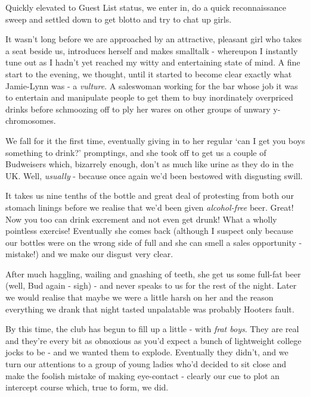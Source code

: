 \documentclass[a5paper,titlepage,11pt,draft]{book}
\begin{document}
Quickly elevated to Guest List status, we enter in, do a quick reconnaissance sweep and settled down to get blotto and try to chat up girls.

It wasn't long before we are approached by an attractive, pleasant girl who takes a seat beside us, introduces herself and makes smalltalk - whereupon I instantly tune out as I hadn't yet reached my witty and entertaining state of mind.  A fine start to the evening, we thought, until it started to become clear exactly what Jamie-Lynn was - a \emph{vulture}.  A saleswoman working for the bar whose job it was to entertain and manipulate people to get them to buy inordinately overpriced drinks before schmoozing off to ply her wares on other groups of unwary y-chromosomes.

We fall for it the first time, eventually giving in to her regular `can I get you boys something to drink?' promptings, and she took off to get us a couple of Budweisers which, bizarrely enough, don't as much like urine as they do in the UK.  Well, \emph{usually} - because once again we'd been bestowed with disgusting swill.

It takes us nine tenths of the bottle and great deal of protesting from both our stomach linings before we realise that we'd been given \emph{alcohol-free} beer.  Great!  Now you too can drink excrement and not even get drunk!  What a wholly pointless exercise!  Eventually she comes back (although I suspect only because our bottles were on the wrong side of full and she can smell a sales opportunity - mistake!) and we make our disgust very clear.

After much haggling, wailing and gnashing of teeth, she get us some full-fat beer (well, Bud again - sigh) - and never speaks to us for the rest of the night.  Later we would realise that maybe we were a little harsh on her and the reason everything we drank that night tasted unpalatable was probably Hooters fault.

By this time, the club has begun to fill up a little - with \emph{frat boys}.  They are real and they're every bit as obnoxious as you'd expect a bunch of lightweight college jocks to be - and we wanted them to explode.  Eventually they didn't, and we turn our attentions to a group of young ladies who'd decided to sit close and make the foolish mistake of making eye-contact - clearly our cue to plot an intercept course which, true to form, we did.
\end{document}
